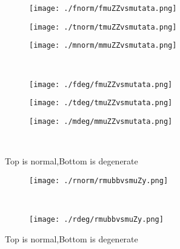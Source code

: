 \documentclass[aps,floats,floatfix,nofootinbib]{revtex4-1}
\begin{document}
\begin{center}
\begin{figure}
\begin{subfigure}{0.3\textwidth}
\texttt{[image: ./fnorm/fmuZZvsmutata.png]}
\label{}
\end{subfigure}
\begin{subfigure}{0.3\textwidth}
\texttt{[image: ./tnorm/tmuZZvsmutata.png]}
\label{}
\end{subfigure}
\begin{subfigure}{0.3\textwidth}
\texttt{[image: ./mnorm/mmuZZvsmutata.png]}
\label{}
\end{subfigure}\\
\begin{subfigure}{0.3\textwidth}
\texttt{[image: ./fdeg/fmuZZvsmutata.png]}
\label{}
\end{subfigure}
\begin{subfigure}{0.3\textwidth}
\texttt{[image: ./tdeg/tmuZZvsmutata.png]}
\label{}
\end{subfigure}
\begin{subfigure}{0.3\textwidth}
\texttt{[image: ./mdeg/mmuZZvsmutata.png]}
\label{}
\end{subfigure}\\
\caption{Top is normal,Bottom is degenerate}
\end{figure}
\end{center}

\begin{center}
\begin{figure}
\begin{subfigure}{0.95\textwidth}
\texttt{[image: ./rnorm/rmubbvsmuZy.png]}
\label{}
\end{subfigure}\\
\begin{subfigure}{0.95\textwidth}
\texttt{[image: ./rdeg/rmubbvsmuZy.png]}
\label{}
\end{subfigure}
\caption{Top is normal,Bottom is degenerate}
\end{figure}
\end{center}
\end{document}
